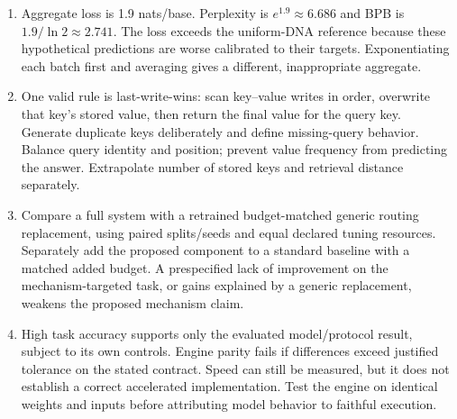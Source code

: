 \begin{enumerate}
\item Aggregate loss is 1.9 nats/base. Perplexity is $e^{1.9}\approx6.686$ and BPB is $1.9/\ln2\approx2.741$. The loss exceeds the uniform-DNA reference because these hypothetical predictions are worse calibrated to their targets. Exponentiating each batch first and averaging gives a different, inappropriate aggregate.
\item One valid rule is last-write-wins: scan key--value writes in order, overwrite that key's stored value, then return the final value for the query key. Generate duplicate keys deliberately and define missing-query behavior. Balance query identity and position; prevent value frequency from predicting the answer. Extrapolate number of stored keys and retrieval distance separately.
\item Compare a full system with a retrained budget-matched generic routing replacement, using paired splits/seeds and equal declared tuning resources. Separately add the proposed component to a standard baseline with a matched added budget. A prespecified lack of improvement on the mechanism-targeted task, or gains explained by a generic replacement, weakens the proposed mechanism claim.
\item High task accuracy supports only the evaluated model/protocol result, subject to its own controls. Engine parity fails if differences exceed justified tolerance on the stated contract. Speed can still be measured, but it does not establish a correct accelerated implementation. Test the engine on identical weights and inputs before attributing model behavior to faithful execution.
\end{enumerate}
